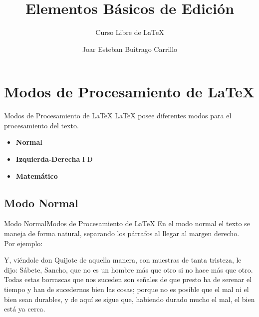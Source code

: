 \documentclass[12pt,aspectratio=43]{beamer}
\title{Elementos Básicos de Edición}
\subtitle{Curso Libre de {\lmr\LaTeX}}
\author{Joar Esteban Buitrago Carrillo}
\institute{Universidad Nacional de Colombia}
\date{}
\makeatletter
\newcommand{\lmr}{\fontfamily{lmr}\selectfont}
\newcommand{\ifratio}[2]{
	\ifthenelse
	{\lengthtest{\beamer@paperwidth=16cm} \AND \lengthtest{\beamer@paperheight=9cm}}
	{#1}
	{#2} }
\makeatother
\begin{document}
\begin{frame}[plain]
\titlepage
\end{frame}

{
\begin{frame}
\ifratio
	{}
	{}
\end{frame}
}

\section{Modos de Procesamiento de {\LaTeX}}

\newcommand{\blindtext}{Y, viéndole don Quijote de aquella manera, con muestras de tanta tristeza, le dijo: Sábete, Sancho, que no es un hombre más que otro si no hace más que otro. Todas estas borrascas que nos suceden son señales de que presto ha de serenar el tiempo y han de sucedernos bien las cosas; porque no es posible que el mal ni el bien sean durables, y de aquí se sigue que, habiendo durado mucho el mal, el bien está ya cerca.}

\begin{frame}{Modos de Procesamiento de {\lmr\LaTeX}}{}
{\lmr\LaTeX} posee diferentes modos para el procesamiento del texto.\\[1em]

\begin{itemize}[<+->]
	\item \alert<1>{\bf Normal}
	\item \alert<2>{\bf Izquierda-Derecha} I-D
	\item \alert<3>{\bf Matemático}
\end{itemize}
\end{frame}

\subsection{Modo Normal}
\begin{frame}{Modo Normal}{Modos de Procesamiento de {\lmr\LaTeX}}
En el modo normal el texto se maneja de forma natural, separando los párrafos al llegar al margen derecho.\pause\\[1em]

Por ejemplo:\\[1em]

\begin{minipage}[c]{\linewidth}
	\lmr\blindtext
\end{minipage}
\end{frame}
\end{document}
